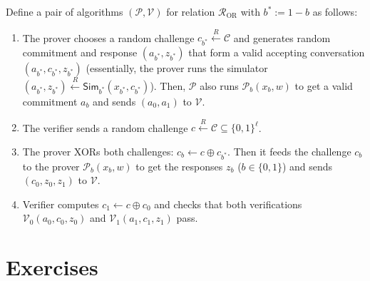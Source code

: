 \documentclass[../lecture-notes.tex]{subfiles}
\begin{document}
\begin{definition}
    Define a pair of algorithms $(\mathcal{P},\mathcal{V})$ for relation $\mathcal{R}_{\text{OR}}$ with $b^* := 1-b$ as follows:
    \begin{enumerate}
        \item The prover chooses a random challenge $c_{b^*} \xleftarrow{R} \mathcal{C}$ and generates random commitment and response $(a_{b^*}, z_{b^*})$ that form a valid accepting conversation $(a_{b^*}, c_{b^*}, z_{b^*})$ (essentially, the prover runs the simulator $(a_{b^*}, z_{b^*}) \xleftarrow{R} \mathsf{Sim}_{b^*}(x_{b^*}, c_{b^*})$). Then, $\mathcal{P}$ also runs $\mathcal{P}_b(x_b, w)$ to get a valid commitment $a_b$ and sends $(a_0,a_1)$ to $\mathcal{V}$.
        \item The verifier sends a random challenge $c \xleftarrow{R} \mathcal{C} \subseteq \{0,1\}^{\ell}$.
        \item The prover XORs both challenges: $c_b \gets c \oplus c_{b^*}$. Then it feeds the challenge $c_b$ to the prover $\mathcal{P}_b(x_b,w)$ to get the responses $z_b$ ($b \in \{0,1\}$) and sends $(c_0,z_0,z_1)$ to $\mathcal{V}$.
        \item Verifier computes $c_1 \gets c \oplus c_0$ and checks that both verifications $\mathcal{V}_0(a_0,c_0,z_0)$ and $\mathcal{V}_1(a_1,c_1,z_1)$ pass.
    \end{enumerate}
\end{definition}

\section{Exercises}
\end{document}
